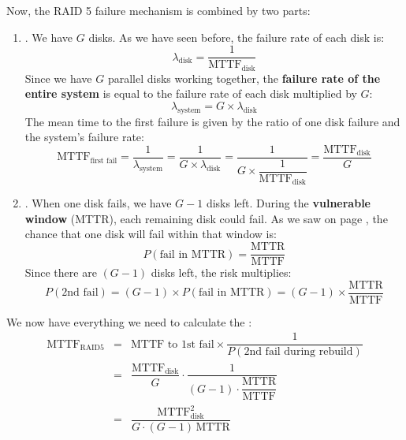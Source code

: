 \noindent
Now, the RAID 5 failure mechanism is combined by two parts:
\begin{enumerate}
    \item {}. We have $G$ disks. As we have seen before, the failure rate of each disk is:
    \begin{equation*}
        \lambda_{\text{disk}} = \dfrac{1}{\text{MTTF}_{\text{disk}}}
    \end{equation*}
    Since we have $G$ parallel disks working together, the \textbf{failure rate of the entire system} is equal to the failure rate of each disk multiplied by $G$:
    \begin{equation*}
        \lambda_{\text{system}} = G \times \lambda_{\text{disk}}
    \end{equation*}
    The mean time to the first failure is given by the ratio of one disk failure and the system's failure rate:
    \begin{equation*}
        \text{MTTF}_{\text{first fail}} = \dfrac{1}{\lambda_{\text{system}}} = \dfrac{1}{G \times \lambda_{\text{disk}}} = \dfrac{1}{G \times \dfrac{1}{\text{MTTF}_{\text{disk}}}} = \dfrac{\text{MTTF}_{\text{disk}}}{G}
    \end{equation*}
    \item {}. When one disk fails, we have $G-1$ disks left. During the \textbf{vulnerable window} (MTTR), each remaining disk could fail. As we saw on page \pageref{eq: RAID 5 - probability that a disk fails in a small time}, the chance that one disk will fail within that window is:
    \begin{equation*}
        P(\text{fail in MTTR}) = \dfrac{\text{MTTR}}{\text{MTTF}}
    \end{equation*}
    Since there are $(G-1)$ disks left, the risk multiplies:
    \begin{equation*}
        P\left(\text{2nd fail}\right) = \left(G-1\right) \times P(\text{fail in MTTR}) = \left(G-1\right) \times \dfrac{\text{MTTR}}{\text{MTTF}}
    \end{equation*}
\end{enumerate}
We now have everything we need to calculate the :
\begin{equation}
    \begin{array}{rcl}
        \text{MTTF}_{\text{RAID5}} &=& \text{MTTF to 1st fail}
        \times
        \dfrac{1}{P(\text{2nd fail during rebuild})} \\ [1.8em]
        &=& \dfrac{\text{MTTF}_{\text{disk}}}{G}
        \cdot
        \dfrac{1}{
            \left(G-1\right) \cdot \dfrac{\text{MTTR}}{\text{MTTF}}
        } \\ [2em]
        &=& \dfrac{
            \text{MTTF}_\text{disk}^{2}
        }{
            G \cdot \left(G-1\right) \, \text{MTTR}
        }
    \end{array}
\end{equation}

